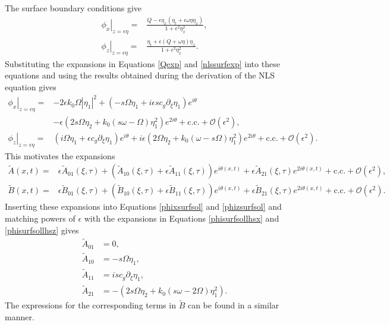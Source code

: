 \documentclass{JFM_Style/jfm}
\newcommand{\pd}{\partial}
\begin{document}
The surface boundary conditions give
\begin{align*}
\left.\phi_{x}\right|_{z=\epsilon\eta} = & \frac{Q-\epsilon\eta_{x}(\eta_{t}+\epsilon\omega\eta\eta_{x})}{1+\epsilon^{2}\eta_{x}^{2}},\\
\left.\phi_{z}\right|_{z=\epsilon\eta} = & \frac{\eta_{t}+\epsilon \left(Q+\omega\eta\right)\eta_{x}}{1+\epsilon^{2}\eta_{x}^{2}}.
\end{align*}
Substituting the expansions in Equations \eqref{Qexp} and \eqref{nlssurfexp} into these equations and using the results obtained during the derivation of the NLS equation gives
\begin{align}
\left.\phi_{x}\right|_{z=\epsilon\eta} = & -2\epsilon k_{0}\Omega \left|\eta_{1} \right|^{2} + \left(-s\Omega\eta_{1} + i\epsilon s c_{g}\pd_{\xi}\eta_{1} \right)e^{i\theta} \nonumber \\
& - \epsilon(2s\Omega\eta_{2}+ k_{0}(s\omega-\Omega) \eta_{1}^{2})e^{2i\theta} + \mbox{c.c.} + \mathcal{O}(\epsilon^{2}),\label{phisurfsollhsx}\\
\left.\phi_{z}\right|_{z=\epsilon\eta} = & (i\Omega \eta_{1}+\epsilon c_{g}\pd_{\xi}\eta_{1})e^{i\theta} + i\epsilon(2\Omega\eta_{2} + k_{0}(\omega-s\Omega)\eta_{1}^{2})e^{2i\theta} + \mbox{c.c.} + \mathcal{O}(\epsilon^{2}). \label{phisurfsollhsz}
\end{align}
This motivates the expansions
\begin{align*}
\tilde{A}(x,t) = &  \epsilon \tilde{A}_{01}(\xi,\tau) + \left(\tilde{A}_{10}(\xi,\tau) + \epsilon \tilde{A}_{11}(\xi,\tau)\right)e^{i\theta(x,t)} + \epsilon \tilde{A}_{21}(\xi,\tau)e^{2i\theta(x,t)} + \mbox{c.c.} + \mathcal{O}(\epsilon^{2}),\\
\tilde{B}(x,t) = &  \epsilon \tilde{B}_{01}(\xi,\tau) + \left(\tilde{B}_{10}(\xi,\tau) + \epsilon \tilde{B}_{11}(\xi,\tau)\right)e^{i\theta(x,t)} + \epsilon \tilde{B}_{21}(\xi,\tau)e^{2i\theta(x,t)} + \mbox{c.c.} + \mathcal{O}(\epsilon^{2}).
\end{align*}
Inserting these expansions into Equations \eqref{phixsurfsol} and \eqref{phizsurfsol} and matching powers of $\epsilon$ with the expansions in Equations \eqref{phisurfsollhsx} and \eqref{phisurfsollhsz} gives
\begin{align*}
\tilde{A}_{01} & =  0,\\
\tilde{A}_{10} & =  -s\Omega \eta_{1},\\
\tilde{A}_{11} & =  isc_{g}\pd_{\xi}\eta_{1},\\
\tilde{A}_{21} & =  -(2s\Omega \eta_{2} + k_{0}(s\omega - 2\Omega)\eta_{1}^{2}).
\end{align*}
The expressions for the corresponding terms in $\tilde{B}$ can be found in a similar manner.
\end{document}
